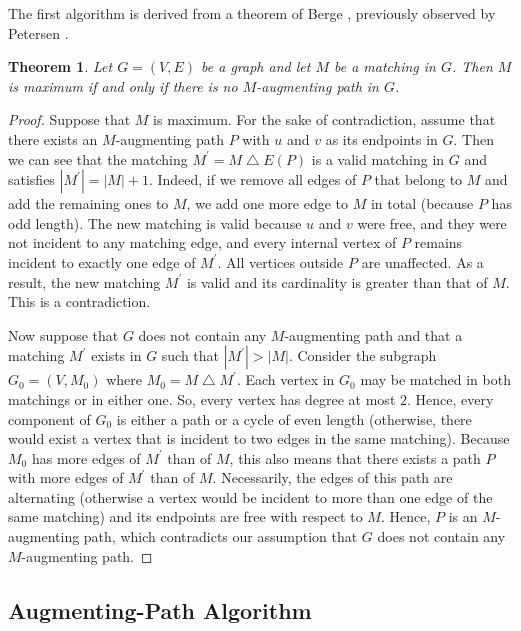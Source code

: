 \documentclass[12pt]{report}
\newtheorem{ttheorem}[base]{Theorem}
\numberwithin{algorithm}{chapter}
\begin{document}
	The first algorithm is derived from a theorem of Berge \cite{berge1957}, previously observed by Petersen \cite{petersen1891theorie}.

	\begin{ttheorem}\label{BergeTheorem}
		Let $G = (V,E)$ be a graph and let $M$ be a matching in $G$. Then $M$ is maximum if and only if there is no $M$-augmenting path in $G$.
	\end{ttheorem}
	\begin{proof}
		Suppose that $M$ is maximum. For the sake of contradiction, assume that there exists an $M$-augmenting path $P$ with $u$ and $v$ as its endpoints in $G$. Then we can see that the matching $M^{'} = M \bigtriangleup E(P)$ is a valid matching in $G$ and satisfies $|M^{'}| = |M| + 1$. Indeed, if we remove all edges of $P$ that belong to $M$ and add the remaining ones to $M$, we add one more edge to $M$ in total (because $P$ has odd length). The new matching is valid because $u$ and $v$ were free, and they were not incident to any matching edge, and every internal vertex of $P$ remains incident to exactly one edge of $M^{'}$. All vertices outside $P$ are unaffected. As a result, the new matching $M^{'}$ is valid and its cardinality is greater than that of $M$. This is a contradiction.

		Now suppose that $G$ does not contain any $M$-augmenting path and that a matching $M^{'}$ exists in $G$ such that $|M^{'}| > |M|$. Consider the subgraph $G_{0} = (V, M_{0})$ where $M_{0} = M \bigtriangleup M^{'}$. Each vertex in $G_{0}$ may be matched in both matchings or in either one. So, every vertex has degree at most $2$. Hence, every component of $G_{0}$ is either a path or a cycle of even length (otherwise, there would exist a vertex that is incident to two edges in the same matching). Because $M_{0}$ has more edges of $M^{'}$ than of $M$, this also means that there exists a path $P$ with more edges of $M^{'}$ than of $M$. Necessarily, the edges of this path are alternating (otherwise a vertex would be incident to more than one edge of the same matching) and its endpoints are free with respect to $M$. Hence, $P$ is an $M$-augmenting path, which contradicts our assumption that $G$ does not contain any $M$-augmenting path.
	\end{proof}

	
	\subsection{Augmenting-Path Algorithm}
\end{document}
